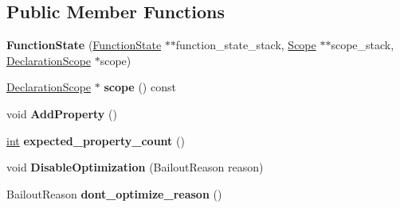 \subsection*{Public Member Functions}
\begin{DoxyCompactItemize}
\item 
\mbox{\label{classv8_1_1internal_1_1ParserBase_1_1FunctionState_a33b05f398235c1c8bffbcc54096bb5b5}} 
{\bfseries Function\+State} (\mbox{\hyperlink{classv8_1_1internal_1_1ParserBase_1_1FunctionState}{Function\+State}} $\ast$$\ast$function\+\_\+state\+\_\+stack, \mbox{\hyperlink{classv8_1_1internal_1_1Scope}{Scope}} $\ast$$\ast$scope\+\_\+stack, \mbox{\hyperlink{classv8_1_1internal_1_1DeclarationScope}{Declaration\+Scope}} $\ast$scope)
\item 
\mbox{\label{classv8_1_1internal_1_1ParserBase_1_1FunctionState_a735e4473f3bc9d57e89c15e97a6510d7}} 
\mbox{\hyperlink{classv8_1_1internal_1_1DeclarationScope}{Declaration\+Scope}} $\ast$ {\bfseries scope} () const
\item 
\mbox{\label{classv8_1_1internal_1_1ParserBase_1_1FunctionState_af127060420e27c3ba4ab5287ef1c421d}} 
void {\bfseries Add\+Property} ()
\item 
\mbox{\label{classv8_1_1internal_1_1ParserBase_1_1FunctionState_a915f977890dd043288c12ea8fbdd458c}} 
\mbox{\hyperlink{classint}{int}} {\bfseries expected\+\_\+property\+\_\+count} ()
\item 
\mbox{\label{classv8_1_1internal_1_1ParserBase_1_1FunctionState_a20acd022be992bcee62ac7a3171f1b98}} 
void {\bfseries Disable\+Optimization} (Bailout\+Reason reason)
\item 
\mbox{\label{classv8_1_1internal_1_1ParserBase_1_1FunctionState_a33e800881f4bb8644c69f19a283c641b}} 
Bailout\+Reason {\bfseries dont\+\_\+optimize\+\_\+reason} ()
\item 
\mbox{\label{classv8_1_1internal_1_1ParserBase_1_1FunctionState_afa6c08365a73f4cf327b9a142b98d971}} 

\end{DoxyCompactItemize}
